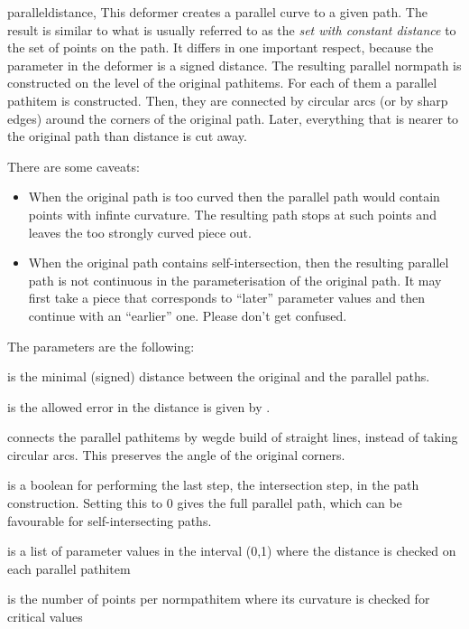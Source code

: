 \begin{classdesc}{parallel}{distance, }%
This deformer creates a parallel curve to a given path. The result is similar to
what is usually referred to as the \emph{set with constant distance} to the set of
points on the path. It differs in one important respect, because the
 parameter in the deformer is a signed distance. The resulting
parallel normpath is constructed on the level of the original pathitems. For
each of them a parallel pathitem is constructed. Then, they are connected by
circular arcs (or by sharp edges) around the corners of the original path.
Later, everything that is nearer to the original path than distance is cut away.

There are some caveats:
\begin{itemize}
  \item When the original path is too curved then the parallel path would
  contain points with infinte curvature. The resulting path stops at such points
  and leaves the too strongly curved piece out.
  \item When the original path contains self-intersection, then the resulting
  parallel path is not continuous in the parameterisation of the original path.
  It may first take a piece that corresponds to ``later'' parameter values and
  then continue with an ``earlier'' one. Please don't get confused.
\end{itemize}

The parameters are the following:

 is the minimal (signed) distance between the original and the
parallel paths.

 is the allowed error in the distance is given by
.

 connects the parallel pathitems by wegde build of
straight lines, instead of taking circular arcs. This preserves the angle of the
original corners.

 is a boolean for performing the last step, the intersection
step, in the path construction. Setting this to 0 gives the full parallel path,
which can be favourable for self-intersecting paths.

 is a list of parameter values in the interval (0,1)
where the distance is checked on each parallel pathitem

 is the number of points per normpathitem where its
curvature is checked for critical values

\end{classdesc}

